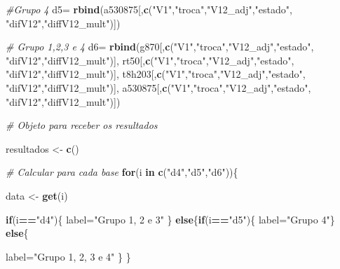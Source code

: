 \documentclass[12pt,a4paper]{article}
\newenvironment{Shaded}{\begin{snugshade}}{\end{snugshade}}
\newcommand{\CommentTok}[1]{\textcolor[rgb]{0.56,0.35,0.01}{\textit{#1}}}
\newcommand{\ControlFlowTok}[1]{\textcolor[rgb]{0.13,0.29,0.53}{\textbf{#1}}}
\newcommand{\KeywordTok}[1]{\textcolor[rgb]{0.13,0.29,0.53}{\textbf{#1}}}
\newcommand{\NormalTok}[1]{#1}
\newcommand{\OperatorTok}[1]{\textcolor[rgb]{0.81,0.36,0.00}{\textbf{#1}}}
\newcommand{\StringTok}[1]{\textcolor[rgb]{0.31,0.60,0.02}{#1}}
\begin{document}
\begin{Shaded}
\begin{Highlighting}[]
{{{{{{\CommentTok{#Grupo 4}
\NormalTok{d5=}\StringTok{ }\KeywordTok{rbind}\NormalTok{(a530875[,}\KeywordTok{c}\NormalTok{(}\StringTok{"V1"}\NormalTok{,}\StringTok{"troca"}\NormalTok{,}\StringTok{"V12_adj"}\NormalTok{,}\StringTok{"estado"}\NormalTok{,}
                      \StringTok{"difV12"}\NormalTok{,}\StringTok{"diffV12_mult"}\NormalTok{)])}

\CommentTok{# Grupo 1,2,3 e 4}
\NormalTok{d6=}\StringTok{ }\KeywordTok{rbind}\NormalTok{(g870[,}\KeywordTok{c}\NormalTok{(}\StringTok{"V1"}\NormalTok{,}\StringTok{"troca"}\NormalTok{,}\StringTok{"V12_adj"}\NormalTok{,}\StringTok{"estado"}\NormalTok{,}
                    \StringTok{"difV12"}\NormalTok{,}\StringTok{"diffV12_mult"}\NormalTok{)],}
\NormalTok{            rt50[,}\KeywordTok{c}\NormalTok{(}\StringTok{"V1"}\NormalTok{,}\StringTok{"troca"}\NormalTok{,}\StringTok{"V12_adj"}\NormalTok{,}\StringTok{"estado"}\NormalTok{,}
                    \StringTok{"difV12"}\NormalTok{,}\StringTok{"diffV12_mult"}\NormalTok{)],}
\NormalTok{            t8h203[,}\KeywordTok{c}\NormalTok{(}\StringTok{"V1"}\NormalTok{,}\StringTok{"troca"}\NormalTok{,}\StringTok{"V12_adj"}\NormalTok{,}\StringTok{"estado"}\NormalTok{,}
                      \StringTok{"difV12"}\NormalTok{,}\StringTok{"diffV12_mult"}\NormalTok{)],}
\NormalTok{            a530875[,}\KeywordTok{c}\NormalTok{(}\StringTok{"V1"}\NormalTok{,}\StringTok{"troca"}\NormalTok{,}\StringTok{"V12_adj"}\NormalTok{,}\StringTok{"estado"}\NormalTok{,}
                      \StringTok{"difV12"}\NormalTok{,}\StringTok{"diffV12_mult"}\NormalTok{)])}


\CommentTok{# Objeto para receber os resultados}

\NormalTok{resultados <-}\StringTok{ }\KeywordTok{c}\NormalTok{()}

\CommentTok{# Calcular para cada base}
\ControlFlowTok{for}\NormalTok{(i }\ControlFlowTok{in} \KeywordTok{c}\NormalTok{(}\StringTok{"d4"}\NormalTok{,}\StringTok{"d5"}\NormalTok{,}\StringTok{"d6"}\NormalTok{))\{}

\NormalTok{data <-}\StringTok{ }\KeywordTok{get}\NormalTok{(i)  }

\ControlFlowTok{if}\NormalTok{(i}\OperatorTok{==}\StringTok{"d4"}\NormalTok{)\{}
\NormalTok{  label=}\StringTok{"Grupo 1, 2 e 3"}
\NormalTok{\} }\ControlFlowTok{else}\NormalTok{\{}\ControlFlowTok{if}\NormalTok{(i}\OperatorTok{==}\StringTok{"d5"}\NormalTok{)\{}
\NormalTok{  label=}\StringTok{"Grupo 4"}\NormalTok{\} }\ControlFlowTok{else}\NormalTok{\{}
    
\NormalTok{    label=}\StringTok{"Grupo 1, 2, 3 e 4"}
\NormalTok{  \}}
\NormalTok{\}}

}}}}}}
\end{Highlighting}
\end{Shaded}
\end{document}
